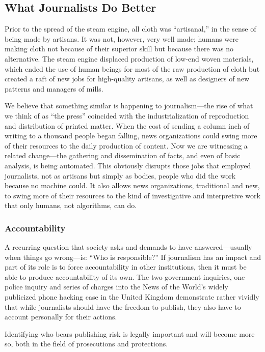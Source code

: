\subsection{What Journalists Do Better}
Prior to the spread of the steam engine, all cloth was ``artisanal,'' in the sense of
being made by artisans. It was not, however, very well made; humans were making
cloth not because of their superior skill but because there was no alternative.
The steam engine displaced production of low-end woven materials, which
ended the use of human beings for most of the raw production of cloth but
created a raft of new jobs for high-quality artisans, as well as designers of new
patterns and managers of mills.

We believe that something similar is happening to journalism—the rise of what
we think of as ``the press'' coincided with the industrialization of reproduction
and distribution of printed matter. When the cost of sending a column inch of
writing to a thousand people began falling, news organizations could swing more
of their resources to the daily production of content. Now we are witnessing a
related change—the gathering and dissemination of facts, and even of basic analysis,
is being automated. This obviously disrupts those jobs that employed journalists,
not as artisans but simply as bodies, people who did the work because no
machine could. It also allows news organizations, traditional and new, to swing
more of their resources to the kind of investigative and interpretive work that
only humans, not algorithms, can do.

\subsubsection{Accountability}
A recurring question that society asks and demands to have answered—usually
when things go wrong—is: ``Who is responsible?'' If journalism has an impact
and part of its role is to force accountability in other institutions, then it must
be able to produce accountability of its own. The two government inquiries,
one police inquiry and series of charges into the News of the World’s widely
publicized phone hacking case in the United Kingdom demonstrate rather vividly
that while journalists should have the freedom to publish, they also have to
account personally for their actions.

Identifying who bears publishing risk is legally important and will become more
so, both in the field of prosecutions and protections.

